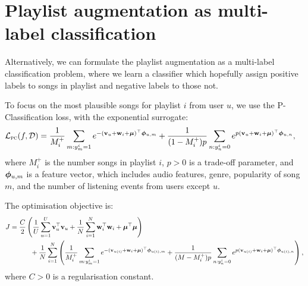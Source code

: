 \section{Playlist augmentation as multi-label classification}

Alternatively, we can formulate the playlist augmentation as a multi-label classification problem,
where we learn a classifier which hopefully assign positive labels to songs in playlist and negative labels to those not.

To focus on the most plausible songs for playlist $i$ from user $u$,
we use the P-Classification loss, with the exponential surrogate:
\begin{equation*}
\begin{aligned}
\mathcal{L}_\textsc{pc}(f, \mathcal{D}) 
&= \frac{1}{M_i^+} \sum_{m: y_m^i = 1} e^{-(\mathbf{v}_u + \mathbf{w}_i + \bm{\mu})^\top \bm{\phi}_{u,m}} 
   + \frac{1}{(1 - M_i^+) p} \sum_{n: y_n^i = 0} e^{p (\mathbf{v}_u + \mathbf{w}_i + \bm{\mu})^\top \bm{\phi}_{u,n}},
\end{aligned}
\end{equation*}
where $M_i^+$ is the number songs in playlist $i$,
$p > 0$ is a trade-off parameter,
and $\bm{\phi}_{u,m}$ is a feature vector,
which includes audio features, genre, popularity of song $m$,
and the number of listening events from users except $u$.

The optimisation objective is:
\begin{equation*}
\begin{aligned}
J &= \frac{C}{2} \left( \frac{1}{U} \sum_{u=1}^U \mathbf{v}_u^\top \mathbf{v}_u 
     + \frac{1}{N} \sum_{i=1}^N \mathbf{w}_i^\top \mathbf{w}_i + \bm{\mu}^\top \bm{\mu} \right) \\
& \hspace{3em}
     + \frac{1}{N} \sum_{i=1}^N \left( \frac{1}{M_i^+} \sum_{m: y_m^i = 1} e^{-(\mathbf{v}_{u(i)} + \mathbf{w}_i + \bm{\mu})^\top \bm{\phi}_{u(i),m}} 
     + \frac{1}{(M - M_i^+) p} \sum_{n: y_n^i = 0} e^{p (\mathbf{v}_{u(i)} + \mathbf{w}_i + \bm{\mu})^\top \bm{\phi}_{u(i),n}} \right),
\end{aligned}
\end{equation*}
where $C > 0$ is a regularisation constant.
